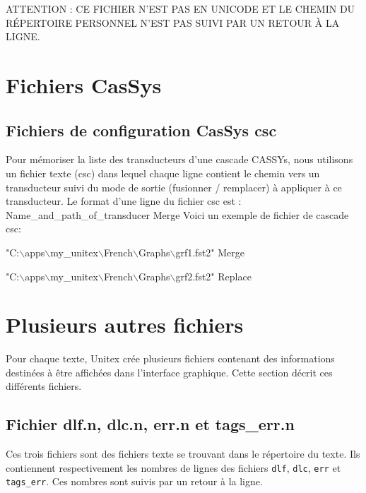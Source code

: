 \bigskip
\noindent ATTENTION : CE FICHIER N’EST PAS EN UNICODE ET LE CHEMIN DU RÉPERTOIRE PERSONNEL N’EST PAS
SUIVI PAR UN RETOUR À LA LIGNE.


\section{Fichiers CasSys}

\subsection{Fichiers de  configuration CasSys csc}

Pour mémoriser la liste des transducteurs d'une cascade CASSYs, nous utilisons un fichier texte
(csc) dans lequel chaque ligne contient le chemin vers un transducteur suivi du mode de sortie
(fusionner / remplacer) à appliquer à ce transducteur.
Le format d'une ligne du fichier csc est : Name\_and\_path\_of\_transducer  Merge
Voici un exemple de fichier de cascade csc:

\ttfamily
"C:$\backslash$apps$\backslash$my\_unitex$\backslash$French$\backslash$Graphs$\backslash$grf1.fst2" Merge

"C:$\backslash$apps$\backslash$my\_unitex$\backslash$French$\backslash$Graphs$\backslash$grf2.fst2" Replace
\rmfamily

\section{Plusieurs autres fichiers}
Pour chaque texte, Unitex crée plusieurs fichiers contenant des informations destinées à être
affichées dans l’interface graphique. Cette section décrit ces différents fichiers.



\subsection{Fichier dlf.n, dlc.n, err.n et tags\_err.n}
Ces trois fichiers sont des fichiers texte se trouvant dans le répertoire du texte. Ils contiennent
respectivement les nombres de lignes des fichiers \verb+dlf+, \verb+dlc+, \verb+err+ et
\verb+tags_err+. Ces nombres sont suivis par un retour à la ligne.




